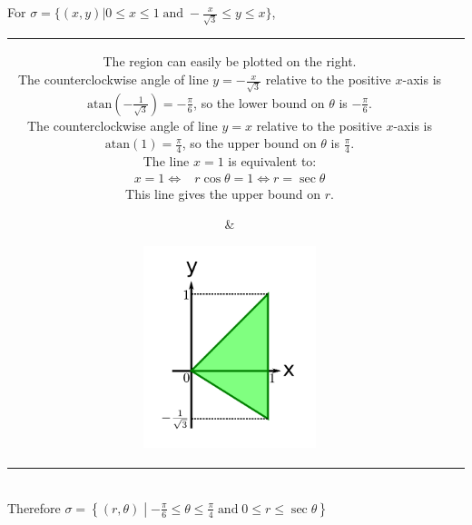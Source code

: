 \documentclass{article}
\newcommand{\atan}{\text{atan}}
\newcommand{\dr}[1]{\textcolor{dark_red}{#1}}
\begin{document}
\pagebreak

\dr{\begin{framed}
For \(\sigma = \{(x,y) | 0 \leq x \leq 1 \;\text{and}\; -\frac{x}{\sqrt{3}} \leq y \leq x\}\), \\
\begin{tabular}{cc}
\parbox{0.6\textwidth}{
The region can easily be plotted on the right. \\
The counterclockwise angle of line \(y = -\frac{x}{\sqrt{3}}\) relative to the positive \(x\)-axis is \(\atan(-\frac{1}{\sqrt{3}}) = -\frac{\pi}{6}\), so the lower bound on \(\theta\) is \(-\frac{\pi}{6}\). \\
The counterclockwise angle of line \(y = x\) relative to the positive \(x\)-axis is \(\atan(1) = \frac{\pi}{4}\), so the upper bound on \(\theta\) is \(\frac{\pi}{4}\). \\
The line \(x = 1\) is equivalent to:
\begin{align*}
x = 1 \iff & r\cos\theta = 1 
\iff r = \sec\theta
\end{align*}
This line gives the upper bound on \(r\).
} & \parbox{0.4\textwidth}{
\includegraphics[width = 0.4\textwidth]{Test_bench_part_3x_images/Test_bench_part_3x_Solutions_image_3}
}
\end{tabular} \\
Therefore \(\sigma = \left\{(r,\theta) \middle| -\frac{\pi}{6} \leq \theta \leq \frac{\pi}{4} \;\text{and}\; 0 \leq r \leq \sec\theta\right\}\)
\end{framed}}
\end{document}
